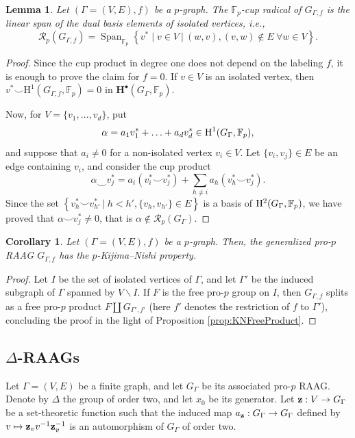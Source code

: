 \documentclass{amsart}
\newtheorem{cor}[thm]{Corollary}
\newtheorem{lem}[thm]{Lemma}
\theoremstyle{definition}
\theoremstyle{remark}
\newcommand{\FF}{\mathbb{F}}
\newcommand{\rmH}{\mathrm H}%
\newcommand{\bfH}{\mathbf{H}^\bullet}%
\newcommand{\set}[2]{\left\lbrace{#1}\ \big\vert\ {#2}\right\rbrace}
\newcommand{\F}{\FF}
\begin{document}
\begin{lem}
\label{lem:radical of RAAG}
Let $(\Gamma=(V,E),f)$ be a $p$-graph. The $\FF_p$-cup radical of $G_{\Gamma,f}$ is the linear span of the dual basis elements of isolated vertices, i.e., \[\mathcal R_p(G_{\Gamma,f})=\operatorname{Span}_{\mathbb F_p}\set{v^\ast\mid v\in V}{ (w,v),(v,w)\notin E\ \forall w\in V}.\]
\end{lem}
\begin{proof} 
    Since the cup product in degree one does not depend on the labeling $f$, it is enough to prove the claim for $f=0$. 
    If $v\in V$ is an isolated vertex, then $v^\ast\smallsmile \rmH^1(G_{\Gamma,f},\F_p)=0$ in $\bfH(G_\Gamma,\mathbb F_p)$. 
    
    Now, for $V=\{v_1,\ldots,v_d\}$, put 
    $$\alpha=a_1 v_1^\ast+\ldots+a_dv_d^*\in {\rm H}^1(G_\Gamma,\mathbb F_p),$$ and suppose that $a_i\neq 0$ for a non-isolated vertex $v_i\in V$. 
    Let $\{v_i,v_j\}\in E$ be an edge containing $v_i$, and consider the cup product 
    $$\alpha\smallsmile v_j^\ast=a_i (v_i^\ast\smallsmile v_j^\ast)+\sum_{h\neq i}a_h (v_h^\ast\smallsmile v_j^\ast).$$
    Since the set $\set{v_h^\ast\smallsmile v_{h'}^\ast}{h<h',\{v_h,v_{h'}\}\in E}$ is a basis of ${\rm H}^2(G_\Gamma,\mathbb F_p)$, we have proved that $\alpha\smallsmile v_j^\ast\neq 0$, that is $\alpha\notin \mathcal R_p(G_\Gamma)$.
\end{proof}

\begin{cor}
    \label{cor:RAAGs have KN}
    Let $(\Gamma=(V,E),f)$ be a $p$-graph. Then, the generalized pro-$p$ RAAG $G_{\Gamma,f}$ has the $p$-Kijima--Nishi property.
\end{cor}
\begin{proof}
    Let $I$ be the set of isolated vertices of $\Gamma$, and let $\Gamma'$ be the induced subgraph of $\Gamma$ spanned by $V\smallsetminus I$. If $F$ is the free pro-$p$ group on $I$, then $G_{\Gamma,f}$ splits as a free pro-$p$ product $F\amalg G_{\Gamma',f'}$
    (here $f'$ denotes the restriction of $f$ to $\Gamma'$), concluding the proof in the light of Proposition \ref{prop:KNFreeProduct}.
\end{proof}

\subsection{\texorpdfstring{$\Delta$}{}-RAAGs}\label{ssec:deltaRAAGs}
 Let $\Gamma=(V,E)$ be a finite graph, and let $G_\Gamma$ be its associated pro-$p$ RAAG. Denote by $\Delta$ the group of order two, and let $x_0$ be its generator. Let ${\bf z}:V\to G_\Gamma$ be a set-theoretic function such that the induced map $a_{\bf z}:G_\Gamma\to G_\Gamma$ defined by $v\mapsto {\bf z}_v v^{-1}{\bf z}_v^{-1}$ is an automorphism of $G_\Gamma$ of order two. 
\end{document}
